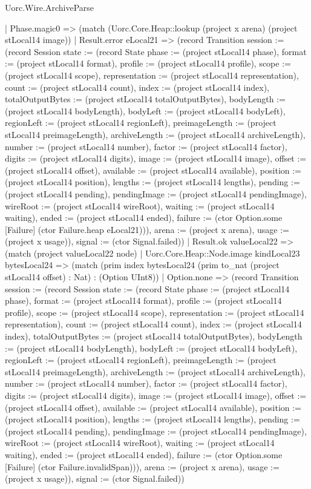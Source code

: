 \begin{lexlean}{Uorc.Wire.ArchiveParse}
\begin{semanticmodule}
{        | Phase.magic0 => (match (Uorc.Core.Heap::lookup (project x arena) (project stLocal14 image))
          | Result.error eLocal21 => (record Transition {session := (record Session {state := (record State {phase := (project stLocal14 phase), format := (project stLocal14 format), profile := (project stLocal14 profile), scope := (project stLocal14 scope), representation := (project stLocal14 representation), count := (project stLocal14 count), index := (project stLocal14 index), totalOutputBytes := (project stLocal14 totalOutputBytes), bodyLength := (project stLocal14 bodyLength), bodyLeft := (project stLocal14 bodyLeft), regionLeft := (project stLocal14 regionLeft), preimageLength := (project stLocal14 preimageLength), archiveLength := (project stLocal14 archiveLength), number := (project stLocal14 number), factor := (project stLocal14 factor), digits := (project stLocal14 digits), image := (project stLocal14 image), offset := (project stLocal14 offset), available := (project stLocal14 available), position := (project stLocal14 position), lengths := (project stLocal14 lengths), pending := (project stLocal14 pending), pendingImage := (project stLocal14 pendingImage), wireRoot := (project stLocal14 wireRoot), waiting := (project stLocal14 waiting), ended := (project stLocal14 ended), failure := (ctor Option.some [Failure] (ctor Failure.heap eLocal21))}), arena := (project x arena), usage := (project x usage)}), signal := (ctor Signal.failed)})
          | Result.ok valueLocal22 => (match (project valueLocal22 node)
            | Uorc.Core.Heap::Node.image kindLocal23 bytesLocal24 => (match (prim index bytesLocal24 (prim to_nat (project stLocal14 offset) : Nat) : (Option UInt8))
              | Option.none => (record Transition {session := (record Session {state := (record State {phase := (project stLocal14 phase), format := (project stLocal14 format), profile := (project stLocal14 profile), scope := (project stLocal14 scope), representation := (project stLocal14 representation), count := (project stLocal14 count), index := (project stLocal14 index), totalOutputBytes := (project stLocal14 totalOutputBytes), bodyLength := (project stLocal14 bodyLength), bodyLeft := (project stLocal14 bodyLeft), regionLeft := (project stLocal14 regionLeft), preimageLength := (project stLocal14 preimageLength), archiveLength := (project stLocal14 archiveLength), number := (project stLocal14 number), factor := (project stLocal14 factor), digits := (project stLocal14 digits), image := (project stLocal14 image), offset := (project stLocal14 offset), available := (project stLocal14 available), position := (project stLocal14 position), lengths := (project stLocal14 lengths), pending := (project stLocal14 pending), pendingImage := (project stLocal14 pendingImage), wireRoot := (project stLocal14 wireRoot), waiting := (project stLocal14 waiting), ended := (project stLocal14 ended), failure := (ctor Option.some [Failure] (ctor Failure.invalidSpan))}), arena := (project x arena), usage := (project x usage)}), signal := (ctor Signal.failed)})
}
\end{semanticmodule}
\end{lexlean}
